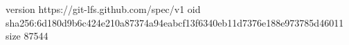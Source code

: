 version https://git-lfs.github.com/spec/v1
oid sha256:6d180d9b6c424e210a87374a94eabcf13f6340eb11d7376e188e973785d46011
size 87544
